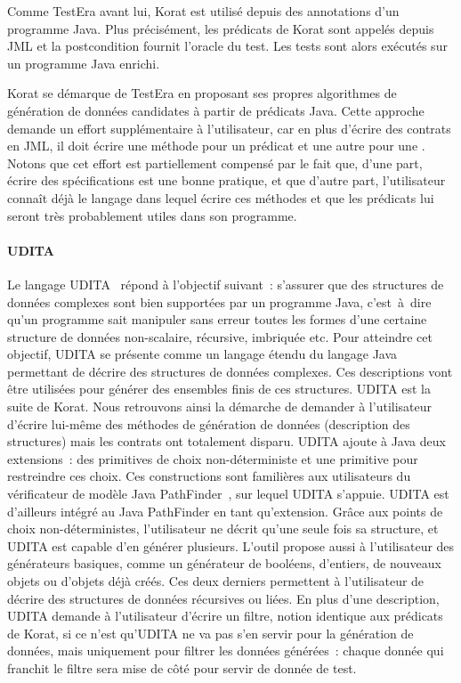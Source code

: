 Comme TestEra avant lui, Korat est utilisé depuis des annotations d'un programme
Java. Plus précisément, les prédicats de Korat sont appelés depuis JML et la
postcondition fournit l'oracle du test. Les tests sont alors exécutés sur un
programme Java enrichi.

Korat se démarque de TestEra en proposant ses propres algorithmes de génération
de données candidates à partir de prédicats Java. Cette approche demande un
effort supplémentaire à l'utilisateur, car en plus d'écrire des contrats en JML,
il doit écrire une méthode pour un prédicat et une autre pour une
. Notons que cet effort est partiellement compensé par
le fait que, d'une part, écrire des spécifications est une bonne pratique, et
que d'autre part, l'utilisateur connaît déjà le langage dans lequel écrire ces
méthodes et que les prédicats lui seront très probablement utiles dans son
programme.

\paragraph{UDITA} Le langage UDITA~ répond à l'objectif
suivant~: s'assurer que des structures de données complexes sont bien supportées
par un programme Java, c'est~à~dire qu'un programme sait manipuler sans erreur
toutes les formes d'une certaine structure de données non-scalaire, récursive,
imbriquée etc. Pour atteindre cet objectif, UDITA se présente comme un langage
étendu du langage Java permettant de décrire des structures de données
complexes. Ces descriptions vont être utilisées pour générer des ensembles finis
de ces structures. UDITA est la suite de Korat. Nous retrouvons ainsi la
démarche de demander à l'utilisateur d'écrire lui-même des méthodes de
génération de données (description des structures) mais les contrats ont
totalement disparu. UDITA ajoute à Java deux extensions~: des primitives de
choix non-déterministe et une primitive pour restreindre ces choix. Ces
constructions sont familières aux utilisateurs du vérificateur de modèle Java
PathFinder~, sur lequel UDITA s'appuie. UDITA est d'ailleurs
intégré au  Java PathFinder en tant qu'extension. Grâce aux
points de choix non-déterministes, l'utilisateur ne décrit qu'une seule fois sa
structure, et UDITA est capable d'en générer plusieurs. L'outil propose aussi à
l'utilisateur des générateurs basiques, comme un générateur de booléens,
d'entiers, de nouveaux objets ou d'objets déjà créés.  Ces deux derniers
permettent à l'utilisateur de décrire des structures de données récursives ou
liées. En plus d'une description, UDITA demande à l'utilisateur d'écrire un
filtre, notion identique aux prédicats de Korat, si ce n'est qu'UDITA ne va pas
s'en servir pour la génération de données, mais uniquement pour filtrer les
données générées~: chaque donnée qui franchit le filtre sera mise de côté pour
servir de donnée de test.

